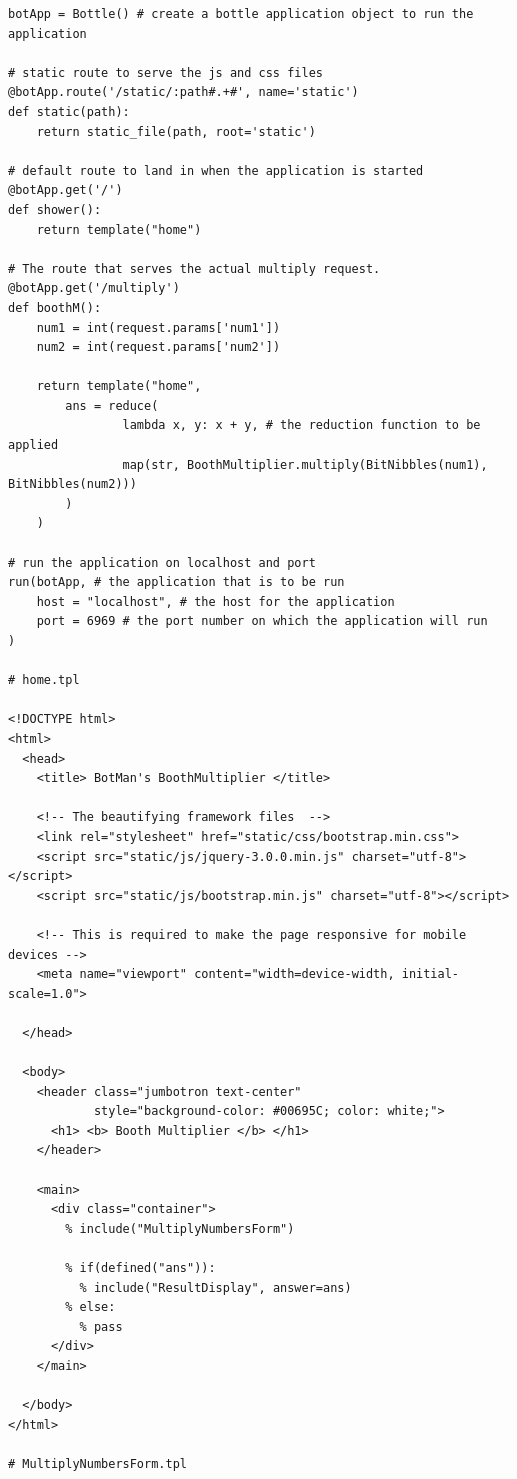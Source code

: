 \documentclass[10pt,a4paper]{article}
\newenvironment{changemargin}[2]{%
\begin{list}{}{%
\setlength{\topsep}{0pt}%
\setlength{\leftmargin}{#1}%
\setlength{\rightmargin}{#2}%
\setlength{\listparindent}{\parindent}%
\setlength{\itemindent}{\parindent}%
\setlength{\parsep}{\parskip}%
}%
\item[]}{\end{list}}
\begin{document}
\begin{changemargin}{-4cm}{-4cm}
\begin{lstlisting}
botApp = Bottle() # create a bottle application object to run the application

# static route to serve the js and css files
@botApp.route('/static/:path#.+#', name='static')
def static(path):
    return static_file(path, root='static')

# default route to land in when the application is started
@botApp.get('/')
def shower():
    return template("home")

# The route that serves the actual multiply request.
@botApp.get('/multiply')
def boothM():
    num1 = int(request.params['num1'])
    num2 = int(request.params['num2'])

    return template("home",
        ans = reduce(
                lambda x, y: x + y, # the reduction function to be applied
                map(str, BoothMultiplier.multiply(BitNibbles(num1), BitNibbles(num2)))
        )
    )

# run the application on localhost and port
run(botApp, # the application that is to be run
    host = "localhost", # the host for the application
    port = 6969 # the port number on which the application will run
)

# home.tpl

<!DOCTYPE html>
<html>
  <head>
    <title> BotMan's BoothMultiplier </title>

    <!-- The beautifying framework files  -->
    <link rel="stylesheet" href="static/css/bootstrap.min.css">
    <script src="static/js/jquery-3.0.0.min.js" charset="utf-8"></script>
    <script src="static/js/bootstrap.min.js" charset="utf-8"></script>

    <!-- This is required to make the page responsive for mobile devices -->
    <meta name="viewport" content="width=device-width, initial-scale=1.0">

  </head>

  <body>
    <header class="jumbotron text-center"
            style="background-color: #00695C; color: white;">
      <h1> <b> Booth Multiplier </b> </h1>
    </header>

    <main>
      <div class="container">
        % include("MultiplyNumbersForm")

        % if(defined("ans")):
          % include("ResultDisplay", answer=ans)
        % else:
          % pass
      </div>
    </main>

  </body>
</html>

# MultiplyNumbersForm.tpl


\end{lstlisting}
\end{changemargin}
\end{document}
